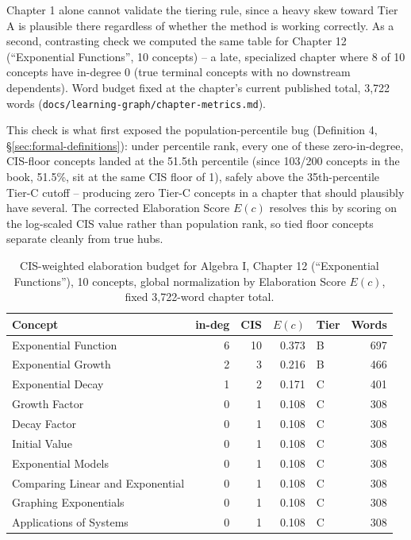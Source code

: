 Chapter 1 alone cannot validate the tiering rule, since a heavy skew toward
Tier A is plausible there regardless of whether the method is working
correctly. As a second, contrasting check we computed the same table for
Chapter 12 (``Exponential Functions'', 10 concepts) -- a late, specialized
chapter where 8 of 10 concepts have in-degree 0 (true terminal concepts with
no downstream dependents). Word budget fixed at the chapter's current
published total, 3{,}722 words
(\texttt{docs/learning-graph/chapter-metrics.md}).

This check is what first exposed the population-percentile bug (Definition 4,
\S\ref{sec:formal-definitions}): under percentile rank, every one of these
zero-in-degree, CIS-floor concepts landed at the 51.5th percentile (since
103/200 concepts in the book, 51.5\%, sit at the same CIS floor of 1), safely
above the 35th-percentile Tier-C cutoff -- producing zero Tier-C concepts in
a chapter that should plausibly have several. The corrected Elaboration Score
$E(c)$ resolves this by scoring on the log-scaled CIS value rather than
population rank, so tied floor concepts separate cleanly from true hubs.

\begin{table}[htbp]
\centering
\caption{CIS-weighted elaboration budget for Algebra I, Chapter 12 (``Exponential Functions''), 10 concepts, global normalization by Elaboration Score $E(c)$, fixed 3{,}722-word chapter total.}
\label{tab:ch12-budget}
\begin{tabular}{lrrrl r}
\toprule
Concept & in-deg & CIS & $E(c)$ & Tier & Words \\
\midrule
Exponential Function              & 6 & 10 & 0.373 & B & 697 \\
Exponential Growth                & 2 & 3  & 0.216 & B & 466 \\
Exponential Decay                 & 1 & 2  & 0.171 & C & 401 \\
Growth Factor                     & 0 & 1  & 0.108 & C & 308 \\
Decay Factor                      & 0 & 1  & 0.108 & C & 308 \\
Initial Value                     & 0 & 1  & 0.108 & C & 308 \\
Exponential Models                & 0 & 1  & 0.108 & C & 308 \\
Comparing Linear and Exponential  & 0 & 1  & 0.108 & C & 308 \\
Graphing Exponentials             & 0 & 1  & 0.108 & C & 308 \\
Applications of Systems           & 0 & 1  & 0.108 & C & 308 \\
\bottomrule
\end{tabular}
\end{table}

